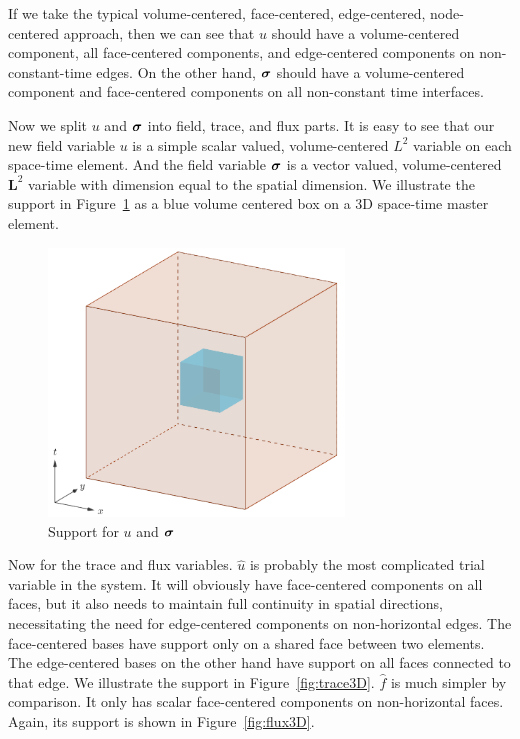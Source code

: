 \documentclass{article}
\begin{document}
If we take the typical volume-centered, face-centered, edge-centered,
node-centered approach, then we can see that $u$ should have a volume-centered
component, all face-centered components, and edge-centered components on
non-constant-time edges. On the other hand, $\boldsymbol\sigma$ should have a
volume-centered component and face-centered components on all non-constant
time interfaces.

Now we split $u$ and $\boldsymbol\sigma$ into field, trace, and flux parts.  It is easy
to see that our new field variable $u$ is a simple scalar valued,
volume-centered $L^2$ variable on each space-time element.  And the field
variable $\boldsymbol\sigma$ is a vector valued, volume-centered $\mathbf{L}^2$
variable with dimension equal to the spatial dimension. We illustrate the
support in Figure~\ref{fig:field3D} as a blue volume centered box on a 3D
space-time master element.

\begin{figure}[!h]
  \centering
  \includegraphics[width=0.7\textwidth]{field3D.png}
  \caption{Support for $u$ and $\boldsymbol\sigma$}
  \label{fig:field3D}
\end{figure}

Now for the trace and flux variables. $\hat u$ is probably the most
complicated trial variable in the system. It will obviously have face-centered
components on all faces, but it also needs to maintain full continuity in
spatial directions, necessitating the need for edge-centered components on
non-horizontal edges. The face-centered bases have support only on a shared
face between two elements. The edge-centered bases on the other hand have
support on all faces connected to that edge. We illustrate the support in
Figure~\ref{fig:trace3D}. $\hat f$ is much simpler by comparison. It only has
scalar face-centered components on non-horizontal faces. Again, its support is
shown in Figure~\ref{fig:flux3D}.
\end{document}
